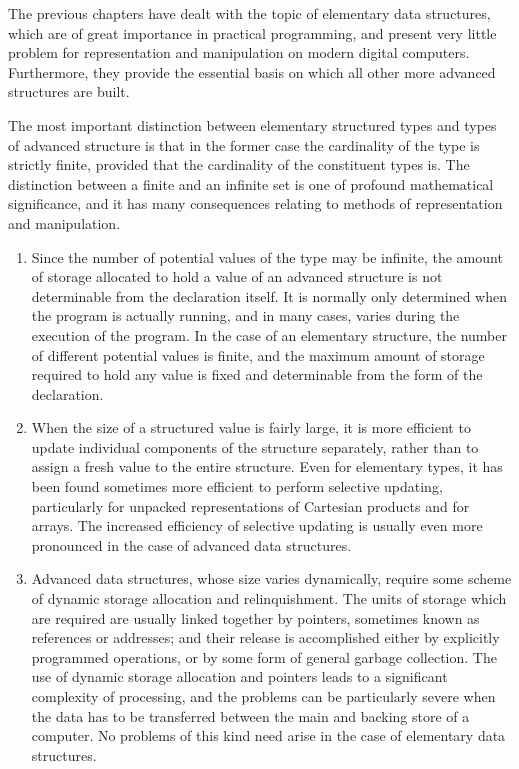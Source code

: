 The previous chapters have dealt with the topic of elementary data structures, which are of great importance in practical programming,  and present very little problem for representation and manipulation on modern digital computers. Furthermore, they provide the essential basis on which all other more advanced structures are built.

The most important distinction between elementary structured types and types of advanced structure is that in the former case the cardinality of the type is strictly finite, provided that the cardinality of the constituent types is. The distinction between a finite and an infinite set is one of profound mathematical significance, and it has many consequences relating to methods of representation and manipulation.

\begin{enumerate}[wide, nosep, label=(\arabic*)]
	\item Since the number of potential values of the type may be infinite, the amount of storage allocated to hold a value of an advanced structure is not determinable from the declaration itself. It is normally only determined when the program is actually running, and in many cases, varies during the execution of the program. In the case of an elementary structure, the number of different potential values is finite, and the maximum amount of storage required to hold any value is fixed and determinable from the form of the declaration.

	\item When the size of a structured value is fairly large, it is more efficient to update individual components of the structure separately, rather than to assign a fresh value to the entire structure. Even for elementary types, it has been found sometimes more efficient to perform selective updating, particularly for unpacked representations of Cartesian products and for arrays. The increased efficiency of selective updating is usually even more pronounced in the case of advanced data structures.

	\item Advanced data structures, whose size varies dynamically, require some scheme of dynamic storage allocation and relinquishment. The units of storage which are required are usually linked together by pointers, sometimes known as references or addresses; and their release is accomplished either by explicitly programmed operations, or by some form of general garbage collection. The use of dynamic storage allocation and pointers leads to a significant complexity of processing, and the problems can be particularly severe when the data has to be transferred between the main and backing store of a computer. No problems of this kind need arise in the case of elementary data structures.


\end{enumerate}
